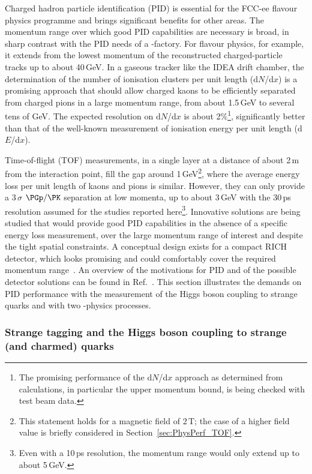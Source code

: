 Charged hadron particle identification (PID) is essential for the FCC-ee flavour physics programme and brings significant benefits for other areas. 
The momentum range over which good PID capabilities are necessary is broad, in sharp contrast with the PID needs of a \PB-factory. 
For flavour physics, for example, it extends from the lowest momentum of the reconstructed charged-particle tracks up to about 40\,GeV.  
In a gaseous tracker like the IDEA drift chamber, the determination of the number of ionisation clusters per unit length (d$N$/d$x$)
is a promising approach that should allow charged kaons to be efficiently separated from charged pions in a large momentum range, from about 1.5\,GeV to several tens of GeV. 
The expected resolution on d$N$/d$x$ 
is about 2\%\footnote{The promising performance of the d$N$/d$x$ approach as determined from calculations, 
in particular the upper momentum bound, is being checked with test beam data.}, 
significantly better than that of the well-known measurement of ionisation energy per unit length (d$E$/d$x$).

Time-of-flight (TOF) measurements, in a single layer at a distance of about 2\,m from the interaction point, 
fill the gap around 1\,GeV\footnote{This statement holds for a magnetic field of 2\,T; the case of a higher field value is briefly considered in Section~\ref{sec:PhysPerf_TOF}.}, 
where the average energy loss per unit length of kaons and pions is similar. 
However, they can only provide a 3\,$\sigma$ $\PGp / \PK$ separation at low momenta, up to about 3\,GeV with the 30\,ps resolution assumed for the studies reported 
here\footnote{Even with a 10\,ps resolution, the momentum range would only extend up to about 5\,GeV.}. 
Innovative solutions are being studied that would provide good PID capabilities in the absence of a specific energy loss measurement, 
over the large momentum range of interest and despite the tight spatial constraints. 
A conceptual design exists for a compact RICH detector, which looks promising and could comfortably cover the required momentum range~\cite{forty_2024_6g0gs-7kw30, Forty_ARC, Tat_ARC}. 
An overview of the motivations for PID and of the possible detector solutions can be found in Ref.~\cite{Wilkinson:2021ehf}. 
This section illustrates the demands on PID performance with the measurement of the Higgs boson coupling to strange quarks and with two \PB-physics processes.

\subsubsection{Strange tagging and the Higgs boson coupling to strange (and charmed) quarks}
\label{sec:PhysPerf_strangeTagging}


